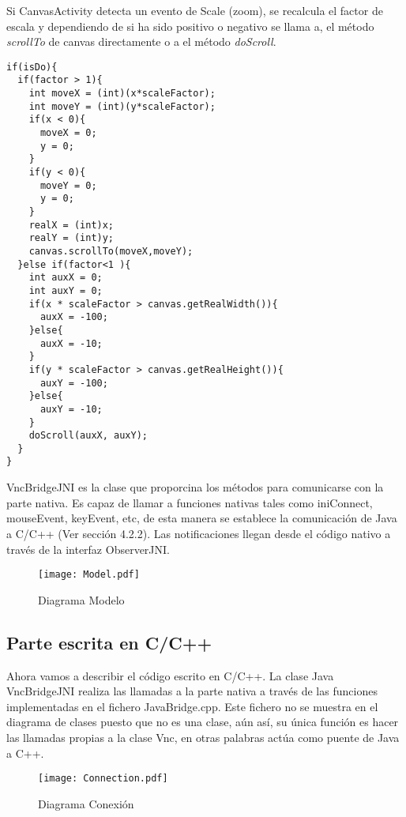 Si CanvasActivity detecta un evento de Scale (zoom), se recalcula el factor de escala y dependiendo de si ha sido positivo o negativo se llama a, el método \emph{scrollTo} de canvas directamente o a el método \emph{doScroll}.
\begin{lstlisting}
if(isDo){
  if(factor > 1){		
    int moveX = (int)(x*scaleFactor);
    int moveY = (int)(y*scaleFactor);
    if(x < 0){
      moveX = 0;
      y = 0;
    }
    if(y < 0){
      moveY = 0;
      y = 0;
    }
    realX = (int)x;
    realY = (int)y;
    canvas.scrollTo(moveX,moveY);
  }else if(factor<1 ){
    int auxX = 0;
    int auxY = 0;
    if(x * scaleFactor > canvas.getRealWidth()){
      auxX = -100;
    }else{
      auxX = -10;
    }
    if(y * scaleFactor > canvas.getRealHeight()){
      auxY = -100;
    }else{
      auxY = -10;
    }
    doScroll(auxX, auxY);
  }
}
\end{lstlisting}

VncBridgeJNI es la clase que proporcina los métodos para comunicarse con la parte nativa. Es capaz de llamar a funciones nativas tales como iniConnect, mouseEvent, keyEvent, etc, de esta manera se establece la comunicación de Java a C/C++ (Ver sección 4.2.2). Las notificaciones llegan desde el código nativo a través de la interfaz ObserverJNI.

\begin{figure}[h]
\begin{center}
\texttt{[image: Model.pdf]}
\end{center}
\caption{Diagrama Modelo}
\end{figure}

\subsection{Parte escrita en C/C++}

Ahora vamos a describir el código escrito en C/C++. La clase Java VncBridgeJNI realiza las llamadas a la parte nativa a través de las funciones implementadas en el fichero JavaBridge.cpp. Este fichero no se muestra en el diagrama de clases puesto que no es una clase, aún así, su única función es hacer las llamadas propias a la clase Vnc, en otras palabras actúa como puente de Java a C++.

\begin{figure}[h]
\begin{center}
\texttt{[image: Connection.pdf]}
\end{center}
\caption{Diagrama Conexión}
\end{figure}

